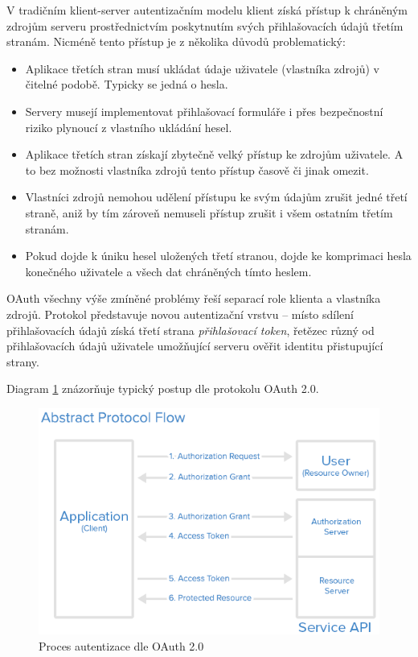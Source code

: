 V tradičním klient-server autentizačním modelu klient získá přístup k chráněným
zdrojům serveru prostřednictvím poskytnutím svých přihlašovacích údajů třetím stranám. Nicméně tento přístup je
z několika důvodů problematický:

\begin{itemize}
    \item Aplikace třetích stran musí ukládat údaje uživatele (vlastníka zdrojů) v čitelné podobě. Typicky se jedná o hesla.
    \item Servery musejí implementovat přihlašovací formuláře i přes bezpečnostní riziko plynoucí z vlastního ukládání hesel.
    \item Aplikace třetích stran získají zbytečně velký přístup ke zdrojům uživatele. A to bez možnosti vlastníka zdrojů 
    tento přístup časově či jinak omezit.
    \item Vlastníci zdrojů nemohou udělení přístupu ke svým údajům zrušit jedné třetí straně, aniž by tím zároveň nemuseli 
    přístup zrušit i všem ostatním třetím stranám.
    \item Pokud dojde k úniku hesel uložených třetí stranou, dojde ke komprimaci hesla konečného uživatele a všech dat chráněných tímto heslem.
\end{itemize}

OAuth všechny výše zmíněné problémy řeší separací role klienta a vlastníka zdrojů. Protokol představuje novou 
autentizační vrstvu – místo sdílení přihlašovacích údajů získá třetí strana \textit{přihlašovací token}, 
řetězec různý od přihlašovacích údajů uživatele umožňující serveru ověřit identitu přistupující strany.~\cite{oauth}

Diagram \ref{fig:oauth} znázorňuje typický postup dle protokolu OAuth 2.0.

\begin{figure}[h!]
    \centering
    \includegraphics[width=\textwidth]{images/oauth.png}
    \caption{Proces autentizace dle OAuth 2.0~\cite{oauthimage}}
    \label{fig:oauth}
\end{figure}


